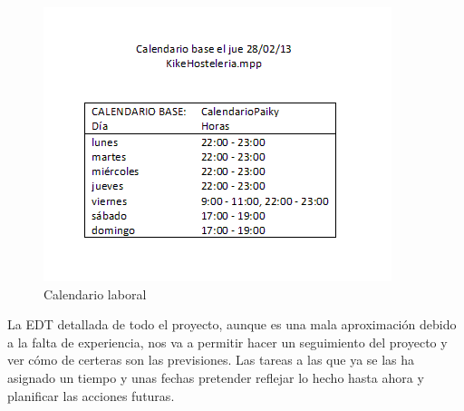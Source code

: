 \documentclass[spanish,a4paper,12pt]{report}	%
\begin{document}
	\begin{figure}[!h]
	\centering
	\includegraphics[scale=0.8]{Calendario.png}
	\vspace{-1.25 true cm}
	\caption{Calendario laboral}
	\end{figure}



	La EDT detallada de todo el proyecto, aunque es una mala aproximación debido a la falta de experiencia,
	nos va a permitir hacer un seguimiento del proyecto y ver cómo de certeras son las previsiones. Las tareas
	a las que ya se las ha asignado un tiempo y unas fechas pretender reflejar lo hecho hasta ahora y planificar 
	las acciones futuras.
	
	\newpage
\end{document}
